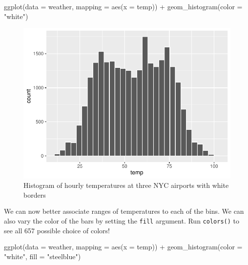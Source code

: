 \documentclass[
  letterpaper,
  DIV=11,
  numbers=noendperiod]{scrreprt}
\newenvironment{Shaded}{\begin{snugshade}}{\end{snugshade}}
\newcommand{\AttributeTok}[1]{\textcolor[rgb]{0.40,0.45,0.13}{#1}}
\newcommand{\FunctionTok}[1]{\textcolor[rgb]{0.28,0.35,0.67}{#1}}
\newcommand{\NormalTok}[1]{\textcolor[rgb]{0.00,0.23,0.31}{#1}}
\newcommand{\SpecialCharTok}[1]{\textcolor[rgb]{0.37,0.37,0.37}{#1}}
\newcommand{\StringTok}[1]{\textcolor[rgb]{0.13,0.47,0.30}{#1}}
\theoremstyle{definition}
\theoremstyle{remark}
\begin{document}
\begin{Shaded}
\begin{Highlighting}[]
\FunctionTok{ggplot}\NormalTok{(}\AttributeTok{data =}\NormalTok{ weather, }\AttributeTok{mapping =} \FunctionTok{aes}\NormalTok{(}\AttributeTok{x =}\NormalTok{ temp)) }\SpecialCharTok{+}
  \FunctionTok{geom\_histogram}\NormalTok{(}\AttributeTok{color =} \StringTok{"white"}\NormalTok{)}
\end{Highlighting}
\end{Shaded}

\begin{figure}[H]

{\centering \includegraphics{02-visualization_files/figure-pdf/fig-weather-histogram-2-1.pdf}

}

\caption{\label{fig-weather-histogram-2}Histogram of hourly temperatures
at three NYC airports with white borders}

\end{figure}

We can now better associate ranges of temperatures to each of the bins.
We can also vary the color of the bars by setting the \texttt{fill}
argument. Run \texttt{colors()} to see all 657 possible choice of
colors!

\begin{Shaded}
\begin{Highlighting}[]
\FunctionTok{ggplot}\NormalTok{(}\AttributeTok{data =}\NormalTok{ weather, }\AttributeTok{mapping =} \FunctionTok{aes}\NormalTok{(}\AttributeTok{x =}\NormalTok{ temp)) }\SpecialCharTok{+}
  \FunctionTok{geom\_histogram}\NormalTok{(}\AttributeTok{color =} \StringTok{"white"}\NormalTok{, }\AttributeTok{fill =} \StringTok{"steelblue"}\NormalTok{)}
\end{Highlighting}
\end{Shaded}
\end{document}
